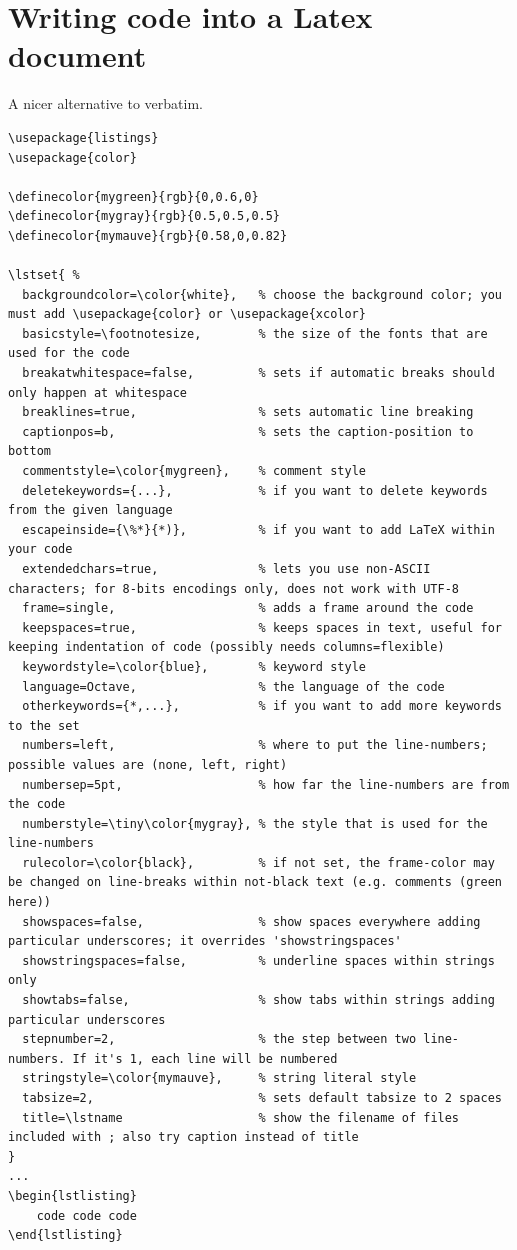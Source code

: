 \documentclass{article}
\begin{document}
\section{Writing code into a Latex document}
A nicer alternative to verbatim.
\begin{verbatim}
\usepackage{listings}
\usepackage{color}

\definecolor{mygreen}{rgb}{0,0.6,0}
\definecolor{mygray}{rgb}{0.5,0.5,0.5}
\definecolor{mymauve}{rgb}{0.58,0,0.82}

\lstset{ %
  backgroundcolor=\color{white},   % choose the background color; you must add \usepackage{color} or \usepackage{xcolor}
  basicstyle=\footnotesize,        % the size of the fonts that are used for the code
  breakatwhitespace=false,         % sets if automatic breaks should only happen at whitespace
  breaklines=true,                 % sets automatic line breaking
  captionpos=b,                    % sets the caption-position to bottom
  commentstyle=\color{mygreen},    % comment style
  deletekeywords={...},            % if you want to delete keywords from the given language
  escapeinside={\%*}{*)},          % if you want to add LaTeX within your code
  extendedchars=true,              % lets you use non-ASCII characters; for 8-bits encodings only, does not work with UTF-8
  frame=single,	                   % adds a frame around the code
  keepspaces=true,                 % keeps spaces in text, useful for keeping indentation of code (possibly needs columns=flexible)
  keywordstyle=\color{blue},       % keyword style
  language=Octave,                 % the language of the code
  otherkeywords={*,...},           % if you want to add more keywords to the set
  numbers=left,                    % where to put the line-numbers; possible values are (none, left, right)
  numbersep=5pt,                   % how far the line-numbers are from the code
  numberstyle=\tiny\color{mygray}, % the style that is used for the line-numbers
  rulecolor=\color{black},         % if not set, the frame-color may be changed on line-breaks within not-black text (e.g. comments (green here))
  showspaces=false,                % show spaces everywhere adding particular underscores; it overrides 'showstringspaces'
  showstringspaces=false,          % underline spaces within strings only
  showtabs=false,                  % show tabs within strings adding particular underscores
  stepnumber=2,                    % the step between two line-numbers. If it's 1, each line will be numbered
  stringstyle=\color{mymauve},     % string literal style
  tabsize=2,	                   % sets default tabsize to 2 spaces
  title=\lstname                   % show the filename of files included with ; also try caption instead of title
}
...
\begin{lstlisting}
    code code code
\end{lstlisting}
\end{verbatim}
\end{document}
